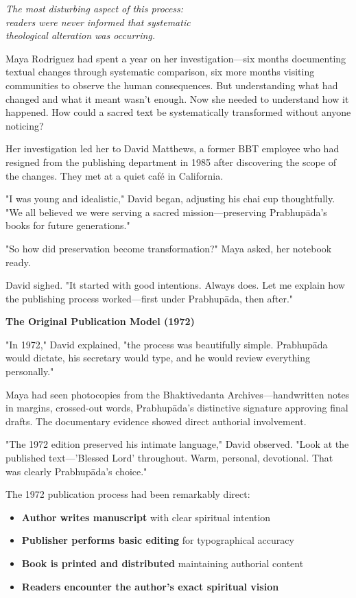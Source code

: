 \documentclass[12pt,twoside]{book}
\begin{document}
{\centering\itshape The most disturbing aspect of this process:\\readers were never informed that systematic\\theological alteration was occurring.\par}
\vspace{0.3cm}

\normalfont\justifying
Maya Rodriguez had spent a year on her investigation—six months documenting textual changes through systematic comparison, six more months visiting communities to observe the human consequences. But understanding what had changed and what it meant wasn't enough. Now she needed to understand how it happened. How could a sacred text be systematically transformed without anyone noticing?

Her investigation led her to David Matthews, a former BBT employee who had resigned from the publishing department in 1985 after discovering the scope of the changes. They met at a quiet café in California.

"I was young and idealistic," David began, adjusting his chai cup thoughtfully. "We all believed we were serving a sacred mission—preserving Prabhupāda's books for future generations."

"So how did preservation become transformation?" Maya asked, her notebook ready.

David sighed. "It started with good intentions. Always does. Let me explain how the publishing process worked—first under Prabhupāda, then after."

\vspace{0.5cm}
\textbf{The Original Publication Model (1972)}
\vspace{0.2cm}


"In 1972," David explained, "the process was beautifully simple. Prabhupāda would dictate, his secretary would type, and he would review everything personally."

Maya had seen photocopies from the Bhaktivedanta Archives—handwritten notes in margins, crossed-out words, Prabhupāda's distinctive signature approving final drafts. The documentary evidence showed direct authorial involvement.

"The 1972 edition preserved his intimate language," David observed. "Look at the published text—'Blessed Lord' throughout. Warm, personal, devotional. That was clearly Prabhupāda's choice."

The 1972 publication process had been remarkably direct:
\begin{itemize}
\item \textbf{\textbf{Author writes manuscript}} with clear spiritual intention
\item \textbf{\textbf{Publisher performs basic editing}} for typographical accuracy
\item \textbf{\textbf{Book is printed and distributed}} maintaining authorial content
\item \textbf{\textbf{Readers encounter the author's exact spiritual vision}}
\end{itemize}
\end{document}
